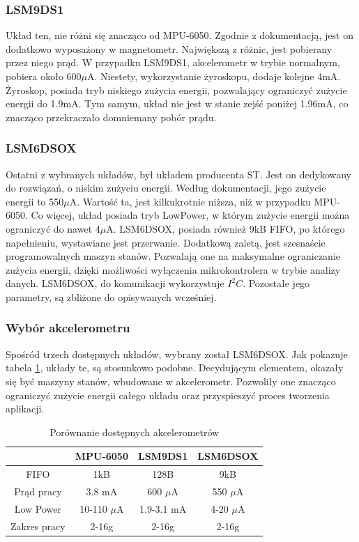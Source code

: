 \subsubsection{LSM9DS1}
Układ ten, nie różni się znacząco od MPU-6050. Zgodnie z dokumentacją, jest on dodatkowo wyposażony w magnetometr. Największą z różnic, jest pobierany przez niego prąd. W przypadku LSM9DS1, akcelerometr w trybie normalnym, pobiera około 600$\mu$A.\cite{LSM9DS1} Niestety, wykorzystanie żyroskopu, dodaje kolejne 4mA. Żyroskop, posiada tryb niskiego zużycia energii, pozwalający ograniczyć zużycie energii do 1.9mA. Tym samym, układ nie jest w stanie zejść poniżej 1.96mA, co znacząco przekraczało domniemany pobór prądu.

\subsubsection{LSM6DSOX}
Ostatni z wybranych układów, był układem producenta ST. Jest on dedykowany do rozwiązań, o niskim zużyciu energii. Według dokumentacji, jego zużycie energii to 550$\mu$A.\cite{LSM6DSOX} Wartość ta, jest kilkukrotnie niższa, niż w przypadku MPU-6050. Co więcej, układ posiada tryb LowPower, w którym zużycie energii można ograniczyć do nawet 4$\mu$A. LSM6DSOX, posiada również 9kB FIFO, po którego napełnieniu, wystawiane jest przerwanie. Dodatkową zaletą, jest szesnaście programowalnych maszyn stanów. Pozwalają one na maksymalne ograniczanie zużycia energii, dzięki możliwości wyłączenia mikrokontrolera w trybie analizy danych. LSM6DSOX, do komunikacji wykorzystuje $I^{2}C$. Pozostałe jego parametry, są zbliżone do opisywanych wcześniej.

\subsubsection{Wybór akcelerometru}
Spośród trzech dostępnych układów, wybrany został LSM6DSOX. Jak pokazuje tabela \ref{tab:accelerometer}, układy te, są stosunkowo podobne. Decydującym elementem, okazały się być maszyny stanów, wbudowane w akcelerometr. Pozwoliły one znacząco ograniczyć zużycie energii całego układu oraz przyspieszyć proces tworzenia aplikacji.

\begin{table}[h]
\centering
\begin{tabular}{|c | c | c | c|}
    \hline
     & MPU-6050 & LSM9DS1 & LSM6DSOX \\
    \hline
    FIFO & 1kB  &   128B  & 9kB \\
    \hline
    Prąd pracy  & 3.8 mA & 600 $\mu$A & 550 $\mu$A \\
    \hline
    Low Power & 10-110 $\mu$A & 1.9-3.1 mA & 4-20 $\mu$A\\
    \hline
    Zakres pracy & 2-16g & 2-16g & 2-16g\\
    \hline
\end{tabular}
\caption{Porównanie dostępnych akcelerometrów}
\label{tab:accelerometer}
\end{table}

